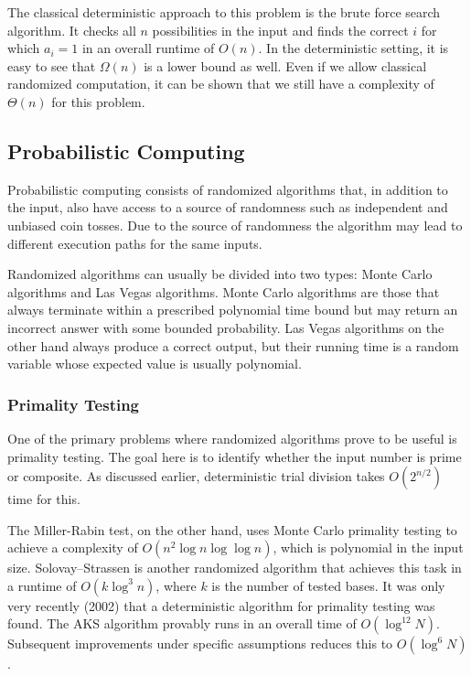 The classical deterministic approach to this problem is the brute force search algorithm. It checks all \( n \) possibilities in the input and finds the correct \( i \) for which \( a_i = 1 \) in an overall runtime of \( O(n) \). In the deterministic setting, it is easy to see that $\Omega(n)$ is a lower bound as well. Even if we allow classical randomized computation, it can be shown that we still have a complexity of $\Theta(n)$ for this problem.

\subsection{Probabilistic Computing}

Probabilistic computing consists of randomized algorithms that, in addition to the input, also have access to a source of randomness such as independent and unbiased coin tosses. Due to the source of randomness the algorithm may lead to different execution paths for the same inputs.

Randomized algorithms can usually be divided into two types: Monte Carlo algorithms and Las Vegas algorithms. Monte Carlo algorithms are those that always terminate within a prescribed polynomial time bound but may return an incorrect answer with some bounded probability. Las Vegas algorithms on the other hand always produce a correct output, but their running time is a random variable whose expected value is usually polynomial.

\subsubsection{Primality Testing}
One of the primary problems where randomized algorithms prove to be useful is primality testing. The goal here is to identify whether the input number is prime or composite. As discussed earlier, deterministic trial division takes \( O(2^{n/2}) \) time for this.

The Miller-Rabin test, on the other hand, uses Monte Carlo primality testing to achieve a complexity of \( O(n^{2} \log n \log \log n) \), which is polynomial in the input size. Solovay--Strassen \cite{SolovayStrassen77} is another randomized algorithm that achieves this task in a runtime of \( O(k \log^{3} n) \), where \( k \) is the number of tested bases. It was only very recently (2002) that a deterministic algorithm for primality testing was found. The AKS algorithm \cite{AKS04} provably runs in an overall time of \( O(\log^{12} N) \). Subsequent improvements under specific assumptions reduces this to \( O(\log^{6} N) \) \cite{LenstraPomerance19}.

